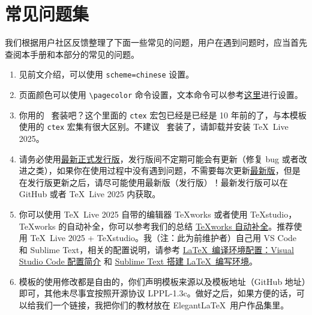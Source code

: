 \chapter{常见问题集}

我们根据用户社区反馈整理了下面一些常见的问题，用户在遇到问题时，应当首先查阅本手册和本部分的常见的问题。

\begin{enumerate}[itemsep=1.5ex]
  \item {}
    见前文介绍，可以使用 \lstinline{scheme=chinese} 设置。
  \item {}
    页面颜色可以使用 \lstinline{\pagecolor} 命令设置，文本命令可以参考\href{https://tex.stackexchange.com/questions/278544/xcolor-what-is-the-equivalent-of-default-text-color}{这里}进行设置。
  \item {}
    你用的 \CTeX\ 套装吧？这个里面的 \lstinline{ctex} 宏包已经是已经是 10 年前的了，与本模板使用的 \lstinline{ctex} 宏集有很大区别。不建议 \CTeX\ 套装了，请卸载并安装 \TeX~Live 2025。
  \item {}
    请务必使用\href{https://github.com/ElegantLaTeX/ElegantBook/releases}{最新正式发行版}，发行版间不定期可能会有更新（修复 bug 或者改进之类），如果你在使用过程中没有遇到问题，不需要每次更新\href{https://github.com/ElegantLaTeX/ElegantBook/archive/master.zip}{最新版}，但是在发行版更新之后，请尽可能使用最新版（发行版）！最新发行版可以在 GitHub 或者 \TeX~Live 2025 内获取。
  \item {}
    你可以使用 \TeX~Live 2025 自带的编辑器 \TeX works 或者使用 \TeX studio，\TeX works 的自动补全，你可以参考我们的总结 \href{https://github.com/EthanDeng/texworks-autocomplete}{\TeX works 自动补全}。推荐使用 \TeX~Live 2025 + \TeX studio。我（注：此为前维护者）自己用 VS Code 和 Sublime Text，相关的配置说明，请参考 \href{https://github.com/EthanDeng/vscode-latex}{\LaTeX\ 编译环境配置：Visual Studio Code 配置简介} 和 \href{https://github.com/EthanDeng/sublime-text-latex}{Sublime Text 搭建 \LaTeX\ 编写环境}。
  \item {}
    模板的使用修改都是自由的，你们声明模板来源以及模板地址（GitHub 地址）即可，其他未尽事宜按照开源协议 LPPL-1.3c。做好之后，如果方便的话，可以给我们一个链接，我把你们的教材放在 Elegant\LaTeX\ 用户作品集里。

\end{enumerate}
